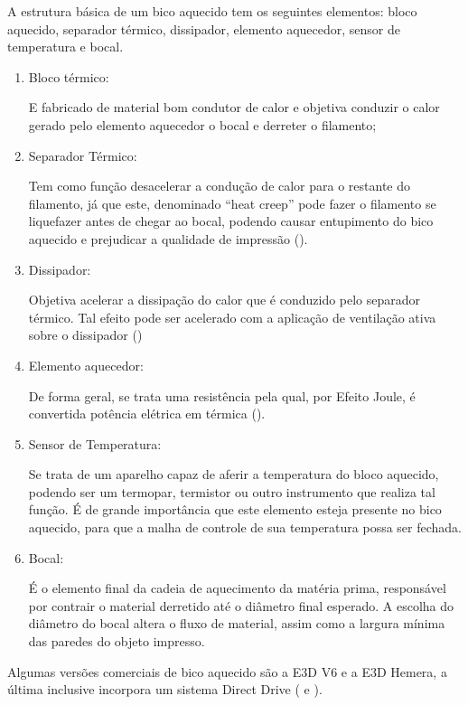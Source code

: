 \documentclass[12pt, english]{article}
\begin{document}
A estrutura básica de um bico aquecido tem os seguintes elementos: bloco aquecido, separador térmico, dissipador, elemento aquecedor, sensor de temperatura e bocal.
	
\begin{enumerate}
	\item {
		Bloco térmico: 
		
		E fabricado de material bom condutor de calor e objetiva conduzir o calor gerado pelo elemento aquecedor o bocal e derreter o filamento;
	}
	\item {
		Separador Térmico: 
		
		Tem como função desacelerar a condução de calor para o restante do filamento, já que este, denominado “heat creep” pode fazer o filamento se liquefazer antes de chegar ao bocal, podendo causar entupimento do bico aquecido e prejudicar a qualidade de impressão (\cite{ALL3DP:HowtoFixHeatCreep}). 
	}
	\item {
		Dissipador: 
		
		Objetiva acelerar a dissipação do calor que é conduzido pelo separador térmico. Tal efeito pode ser acelerado com a aplicação de ventilação ativa sobre o dissipador (\cite{ALL3DP:HowtoPreventHeatCreep}) 
	}
	\item {
		Elemento aquecedor: 
		
		De forma geral, se trata uma resistência pela qual, por Efeito Joule, é convertida potência elétrica em térmica (\cite{Passos2009}).
		
	}
	\item {
		Sensor de Temperatura: 
		
		Se trata de um aparelho capaz de aferir a temperatura do bloco aquecido, podendo ser um termopar, termistor ou outro instrumento que realiza tal função. É de grande importância que este elemento esteja presente no bico aquecido, para que a malha de controle de sua temperatura possa ser fechada.
	}
	\item {
		Bocal:  
		
		É o elemento final da cadeia de aquecimento da matéria prima, responsável por contrair o material derretido até o diâmetro final esperado. A escolha do diâmetro do bocal altera o fluxo de material, assim como a largura mínima das paredes do objeto impresso.
	}
\end{enumerate}

Algumas versões comerciais de bico aquecido são a E3D V6 e a E3D Hemera, a última inclusive incorpora um sistema Direct Drive (\cite{V6} e \cite{HEMERA}).
\end{document}
